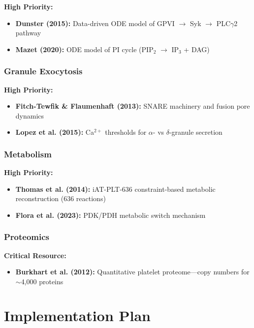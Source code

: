 \documentclass[11pt,a4paper]{report}
\begin{document}
\textbf{High Priority:}

\begin{itemize}
    \item \textbf{Dunster (2015):} Data-driven ODE model of GPVI $\to$ Syk $\to$ PLC$\gamma$2 pathway
    \item \textbf{Mazet (2020):} ODE model of PI cycle (PIP$_2$ $\to$ IP$_3$ + DAG)
\end{itemize}

\subsection{Granule Exocytosis}

\textbf{High Priority:}

\begin{itemize}
    \item \textbf{Fitch-Tewfik \& Flaumenhaft (2013):} SNARE machinery and fusion pore dynamics
    \item \textbf{Lopez et al. (2015):} Ca$^{2+}$ thresholds for $\alpha$- vs $\delta$-granule secretion
\end{itemize}

\subsection{Metabolism}

\textbf{High Priority:}

\begin{itemize}
    \item \textbf{Thomas et al. (2014):} iAT-PLT-636 constraint-based metabolic reconstruction (636 reactions)
    \item \textbf{Flora et al. (2023):} PDK/PDH metabolic switch mechanism
\end{itemize}

\subsection{Proteomics}

\textbf{Critical Resource:}

\begin{itemize}
    \item \textbf{Burkhart et al. (2012):} Quantitative platelet proteome---copy numbers for $\sim$4,000 proteins
\end{itemize}

\chapter{Implementation Plan}
\end{document}
